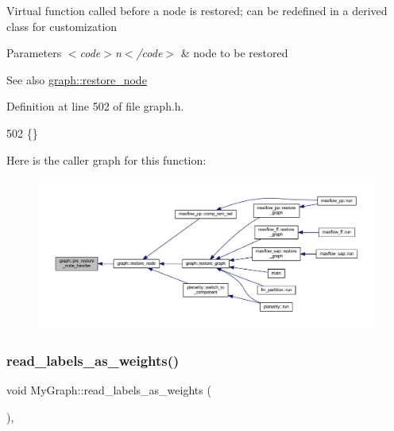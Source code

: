 Virtual function called before a node is restored; can be redefined in a derived class for customization


\begin{DoxyParams}{Parameters}
{\em $<$code$>$n$<$/code$>$} & node to be restored \\
\hline
\end{DoxyParams}
\begin{DoxySeeAlso}{See also}
\mbox{\hyperlink{classgraph_ab57aab79e649cc275052b7decbdd03ec}{graph\+::restore\+\_\+node}} 
\end{DoxySeeAlso}


Definition at line 502 of file graph.\+h.


\begin{DoxyCode}
502 \{\}       
\end{DoxyCode}
Here is the caller graph for this function\+:
\nopagebreak
\begin{figure}[H]
\begin{center}
\leavevmode
\includegraphics[width=350pt]{classgraph_a3a305d240ab5237a2adae315b50105a6_icgraph}
\end{center}
\end{figure}
\mbox{\label{class_my_graph_a5d90ef0fba45bbbdf53a3bfe6f9a7061}} 
\subsubsection{\texorpdfstring{read\+\_\+labels\+\_\+as\+\_\+weights()}{read\_labels\_as\_weights()}}
{\footnotesize\ttfamily void My\+Graph\+::read\+\_\+labels\+\_\+as\+\_\+weights (\begin{DoxyParamCaption}{ }\end{DoxyParamCaption})\hspace{0.3cm}{\ttfamily [inline]}, {\ttfamily [inherited]}}

